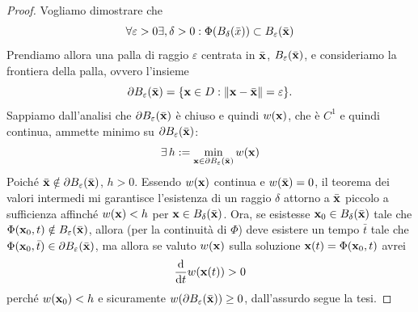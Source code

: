 \begin{proof}
    Vogliamo dimostrare che 
    \begin{equation}
        \forall \varepsilon>0 \exists, \delta>0: \Phi(B_\delta(\bar{x})) \subset B_\varepsilon(\bar{\mathbf{x}})
    \end{equation}
    Prendiamo allora una palla di raggio $\varepsilon$ centrata in $\bar{\mathbf{x}}$, $B_\varepsilon(\bar{\mathbf{x}})$, e consideriamo la frontiera della palla, ovvero l'insieme
    \begin{equation}
        \partial B_\varepsilon(\bar{\mathbf{x}}) = \{\mathbf{x}\in D: \|\mathbf{x}-\bar{\mathbf{x}}\|=\varepsilon \}.
    \end{equation}
    Sappiamo dall'analisi che $\partial B_\varepsilon(\bar{\mathbf{x}})$ è chiuso e quindi $w(\mathbf{x})$, che è $C^1$ e quindi continua, ammette minimo su $\partial B_\varepsilon(\bar{\mathbf{x}})$:
    \begin{equation}
        \exists\,h := \min_{\mathbf{x}\in\partial B_\varepsilon(\bar{\mathbf{x}})} w(\mathbf{x})
    \end{equation}
    Poiché $\bar{\mathbf{x}} \notin \partial B_\varepsilon(\bar{\mathbf{x}})$, $h>0$. Essendo $w(\mathbf{x})$ continua e $w(\bar{\mathbf{x}}) = 0$, il teorema dei valori intermedi mi garantisce l'esistenza di un raggio $\delta$ attorno a $\bar{\mathbf{x}}$ piccolo a sufficienza affinché $w(\mathbf{x})<h$ per $\mathbf{x}\in B_\delta(\bar{\mathbf{x}})$. Ora, se esistesse $\mathbf{x}_0\in B_\delta(\bar{\mathbf{x}})$ tale che $\Phi(\mathbf{x}_0,t) \notin B_\varepsilon(\bar{\mathbf{x}})$, allora (per la continuità di $\Phi$) deve esistere un tempo $\bar{t}$ tale che $\Phi(\mathbf{x}_0,\bar{t})\in\partial B_\varepsilon(\bar{\mathbf{x}})$, ma allora se valuto $w(\mathbf{x})$ sulla soluzione $\mathbf{x}(t) = \Phi(\mathbf{x}_0,t)$ avrei
    \begin{equation}
        \frac{\mathrm{d}}{\mathrm{d}t} w(\mathbf{x}(t)) >0
    \end{equation}
    perché $w(\mathbf{x}_0)<h$ e sicuramente $w(\partial B_\varepsilon(\bar{\mathbf{x}}))\geq 0$, dall'assurdo segue la tesi.
\end{proof}

